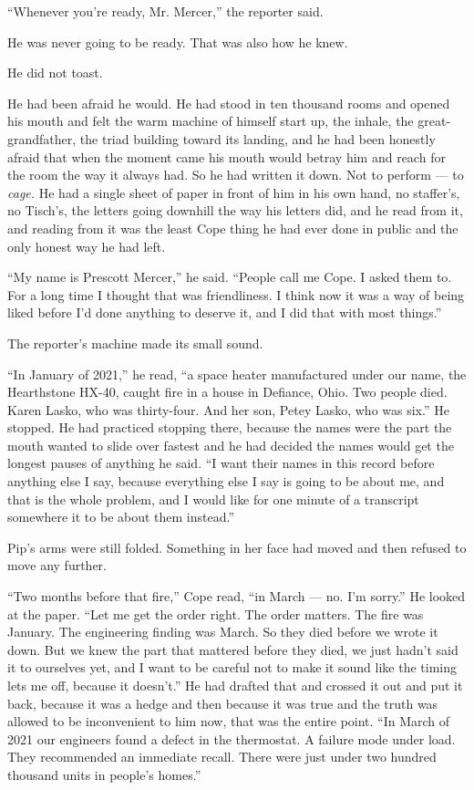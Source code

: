 \documentclass[11pt,openany]{book}
\newcommand{\scenebreak}{\par\vspace{0.5\baselineskip}\begin{center}\textasteriskcentered\quad\textasteriskcentered\quad\textasteriskcentered\end{center}\vspace{0.5\baselineskip}\par}
\begin{document}
``Whenever you're ready, Mr. Mercer,'' the reporter said.

He was never going to be ready. That was also how he knew.


\scenebreak


He did not toast.

He had been afraid he would. He had stood in ten thousand rooms and opened his mouth and felt the warm machine of himself start up, the inhale, the great-grandfather, the triad building toward its landing, and he had been honestly afraid that when the moment came his mouth would betray him and reach for the room the way it always had. So he had written it down. Not to perform --- to \textit{cage.} He had a single sheet of paper in front of him in his own hand, no staffer's, no Tisch's, the letters going downhill the way his letters did, and he read from it, and reading from it was the least Cope thing he had ever done in public and the only honest way he had left.

``My name is Prescott Mercer,'' he said. ``People call me Cope. I asked them to. For a long time I thought that was friendliness. I think now it was a way of being liked before I'd done anything to deserve it, and I did that with most things.''

The reporter's machine made its small sound.

``In January of 2021,'' he read, ``a space heater manufactured under our name, the Hearthstone HX-40, caught fire in a house in Defiance, Ohio. Two people died. Karen Lasko, who was thirty-four. And her son, Petey Lasko, who was six.'' He stopped. He had practiced stopping there, because the names were the part the mouth wanted to slide over fastest and he had decided the names would get the longest pauses of anything he said. ``I want their names in this record before anything else I say, because everything else I say is going to be about me, and that is the whole problem, and I would like for one minute of a transcript somewhere it to be about them instead.''

Pip's arms were still folded. Something in her face had moved and then refused to move any further.

``Two months before that fire,'' Cope read, ``in March --- no. I'm sorry.'' He looked at the paper. ``Let me get the order right. The order matters. The fire was January. The engineering finding was March. So they died before we wrote it down. But we knew the part that mattered before they died, we just hadn't said it to ourselves yet, and I want to be careful not to make it sound like the timing lets me off, because it doesn't.'' He had drafted that and crossed it out and put it back, because it was a hedge and then because it was true and the truth was allowed to be inconvenient to him now, that was the entire point. ``In March of 2021 our engineers found a defect in the thermostat. A failure mode under load. They recommended an immediate recall. There were just under two hundred thousand units in people's homes.''
\end{document}
